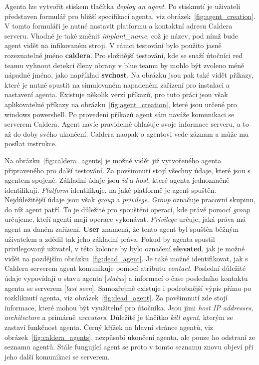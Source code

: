 Agenta lze vytvořit stiskem tlačítka \textit{deploy an agent}.
Po stisknutí je uživateli představen formulář pro bližší specifikaci agenta, viz obrázek~\ref{fig:agent_creation}.
V tomto formuláři je nutné nastavit platformu a kontaktní adresu Caldera serveru.
Vhodné je také změnit \textit{implant\_name}, což je název, pod nímž bude agent vidět na infikovaném stroji.
V rámci testování bylo použito jasně rozeznatelné jméno \textbf{caldera}.
Pro složitější testování, kde se snaží útočníci red teamu vyhnout detekci členy obrany v blue teamu by mohlo být zvoleno méně nápadné jméno, jako například \textbf{svchost}.
Na obrázku jsou pak také vidět příkazy, které je nutné spustit na simulovaném napadeném zařízení pro instalaci a nastavení agenta.
Existuje několik verzí příkazů, pro tuto práci jsou však aplikovatelné příkazy na obrázku~\ref{fig:agent_creation}, které jsou určené pro windows powershell.
Po provedení příkazů agent sám naváže komunikaci se serverem Caldera.
Agent navíc pravidelně ohlašuje svoje informace serveru, a to až do doby svého ukončení.
Caldera naopak o agentovi vede záznam a může mu posílat instrukce.


Na obrázku~\ref{fig:caldera_agents} je možné vidět již vytvořeného agenta připraveného pro další testování.
Za povšimnutí stojí všechny údaje, které jsou s agentem spojené.
Základní údaje jsou \textit{id} a \textit{host}, které agenta jednoznačně identifikují.
\textit{Platform} identifikuje, na jaké platformě je agent spuštěn.
Nejdůležitější údaje jsou však \textit{group} a \textit{privilege}.
\textit{Group} označuje pracovní skupinu, do níž agent patří.
To je důležité pro spouštění operací, kde právě pomocí \textit{group} určujeme, kteří agenti mají operace vykonávat.
\textit{Privilege} určuje, jaká práva má agent na daném zařízení.
\textbf{User} znamená, že tento agent byl spuštěn běžným uživatelem a zdědil tak jeho základní práva.
Pokud by agenta spustil privilegovaný uživatel, v této kolonce by bylo označení \textbf{elevated}, jak je možné vidět na pozdějším obrázku~\ref{fig:dead_agent}.
Je také možné identifikovat, jak s Caldera serverem agent komunikuje pomocí atributu \textit{contact}.
Poslední důležité údaje vypovídají o stavu agenta [\textit{status}] a informací o čase posledního kontaktu agenta se serverem [\textit{last seen}].
Samozřejmě existuje i podrobnější výpis přímo po rozkliknutí agenta, viz obrázek~\ref{fig:dead_agent}.
Za povšimnutí zde stojí informace, které mohou být využitelné pro útočníka.
Jsou jimi \textit{host IP addresses, architecture} a primárně \textit{executors}.
Důležité je tlačítko \textit{kill agent}, kterým se zastaví funkčnost agenta.
Černý křížek na hlavní stránce agentů, viz obrázek~\ref{fig:caldera_agents}, nezpůsobí ukončení agenta, ale pouze ho odstraní ze seznamu agentů.
Stále fungující agent se proto v tomto seznamu znovu objeví při jeho další komunikaci se serverem.

